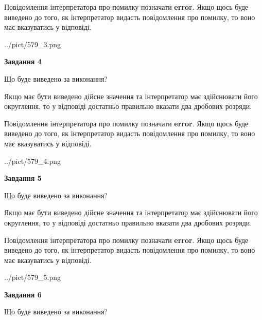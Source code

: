 \documentclass[12pt, ukrainian]{article}
\begin{document}
{\begin {Large}
Повідомлення інтерпретатора про помилку позначати \textbf{error}.
Якщо щось буде виведено до того, як інтерпретатор видасть повідомлення про помилку, 
то воно має вказуватись у відповіді. \par

\begin{center}
	{../pict/579_3.png}
\end{center}
\newpage

{\begin {center}\textbf{Завдання 4}\end {center}}\par
Що буде виведено за виконання? \par

Якщо має бути виведено дійсне значення та інтерпретатор має здійснювати його округлення, 
то у відповіді достатньо правильно вказати два дробових розряди.

Повідомлення інтерпретатора про помилку позначати \textbf{error}.
Якщо щось буде виведено до того, як інтерпретатор видасть повідомлення про помилку, 
то воно має вказуватись у відповіді. \par

\begin{center}
	{../pict/579_4.png}
\end{center}
\newpage

{\begin {center}\textbf{Завдання 5}\end {center}}\par
Що буде виведено за виконання? \par

Якщо має бути виведено дійсне значення та інтерпретатор має здійснювати його округлення, 
то у відповіді достатньо правильно вказати два дробових розряди.

Повідомлення інтерпретатора про помилку позначати \textbf{error}.
Якщо щось буде виведено до того, як інтерпретатор видасть повідомлення про помилку, 
то воно має вказуватись у відповіді. \par

\begin{center}
	{../pict/579_5.png}
\end{center}
\newpage

{\begin {center}\textbf{Завдання 6}\end {center}}\par
Що буде виведено за виконання? \par


\end{Large}}
\end{document}
